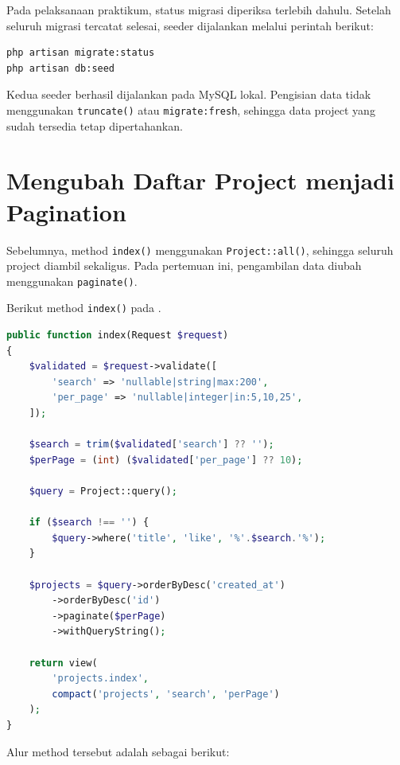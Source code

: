 \documentclass[a4paper,oneside,11pt]{book}
\renewcommand{\_}{\textunderscore\allowbreak{}}
\begin{document}
Pada pelaksanaan praktikum, status migrasi diperiksa terlebih dahulu.
Setelah seluruh migrasi tercatat selesai, seeder dijalankan melalui
perintah berikut:

\begin{lstlisting}[language={},caption={Pemeriksaan migrasi dan pengisian data contoh}]
php artisan migrate:status
php artisan db:seed
\end{lstlisting}

Kedua seeder berhasil dijalankan pada MySQL lokal.
Pengisian data tidak menggunakan \texttt{truncate()} atau
\texttt{migrate:fresh}, sehingga data project yang sudah tersedia
tetap dipertahankan.

\section{Mengubah Daftar Project menjadi Pagination}

Sebelumnya, method \texttt{index()} menggunakan
\texttt{Project::all()}, sehingga seluruh project diambil sekaligus.
Pada pertemuan ini, pengambilan data diubah menggunakan
\texttt{paginate()}.

Berikut method \texttt{index()} pada
.

\begin{lstlisting}[language=PHP,caption={Method index pada ProjectController}]
public function index(Request $request)
{
    $validated = $request->validate([
        'search' => 'nullable|string|max:200',
        'per_page' => 'nullable|integer|in:5,10,25',
    ]);

    $search = trim($validated['search'] ?? '');
    $perPage = (int) ($validated['per_page'] ?? 10);

    $query = Project::query();

    if ($search !== '') {
        $query->where('title', 'like', '%'.$search.'%');
    }

    $projects = $query->orderByDesc('created_at')
        ->orderByDesc('id')
        ->paginate($perPage)
        ->withQueryString();

    return view(
        'projects.index',
        compact('projects', 'search', 'perPage')
    );
}
\end{lstlisting}

Alur method tersebut adalah sebagai berikut:
\end{document}
